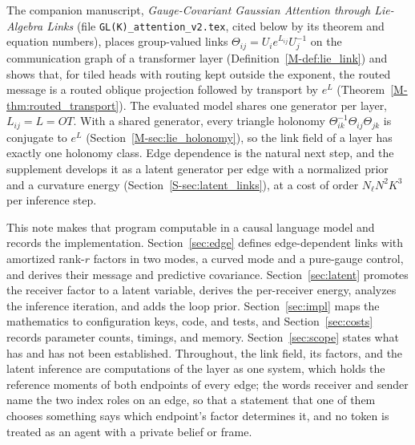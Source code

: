 \documentclass[11pt]{article}
\theoremstyle{definition}
\theoremstyle{remark}
\newcommand{\Mref}[1]{\ref{M-#1}}
\newcommand{\Sref}[1]{\ref{S-#1}}
\begin{document}
The companion manuscript, \emph{Gauge-Covariant Gaussian Attention through Lie-Algebra Links} (file \texttt{GL(K)\_attention\_v2.tex}, cited below by its theorem and equation numbers), places group-valued links $\Theta_{ij}=U_ie^{L_{ij}}U_j^{-1}$ on the communication graph of a transformer layer (Definition~\Mref{def:lie_link}) and shows that, for tiled heads with routing kept outside the exponent, the routed message is a routed oblique projection followed by transport by $e^{L}$ (Theorem~\Mref{thm:routed_transport}). The evaluated model shares one generator per layer, $L_{ij}=L=OT$. With a shared generator, every triangle holonomy $\Theta_{ik}^{-1}\Theta_{ij}\Theta_{jk}$ is conjugate to $e^{L}$ (Section~\Mref{sec:lie_holonomy}), so the link field of a layer has exactly one holonomy class. Edge dependence is the natural next step, and the supplement develops it as a latent generator per edge with a normalized prior and a curvature energy (Section~\Sref{sec:latent_links}), at a cost of order $N_\ell N^2K^3$ per inference step.

This note makes that program computable in a causal language model and records the implementation. Section~\ref{sec:edge} defines edge-dependent links with amortized rank-$r$ factors in two modes, a curved mode and a pure-gauge control, and derives their message and predictive covariance. Section~\ref{sec:latent} promotes the receiver factor to a latent variable, derives the per-receiver energy, analyzes the inference iteration, and adds the loop prior. Section~\ref{sec:impl} maps the mathematics to configuration keys, code, and tests, and Section~\ref{sec:costs} records parameter counts, timings, and memory. Section~\ref{sec:scope} states what has and has not been established. Throughout, the link field, its factors, and the latent inference are computations of the layer as one system, which holds the reference moments of both endpoints of every edge; the words receiver and sender name the two index roles on an edge, so that a statement that one of them chooses something says which endpoint's factor determines it, and no token is treated as an agent with a private belief or frame.
\end{document}
